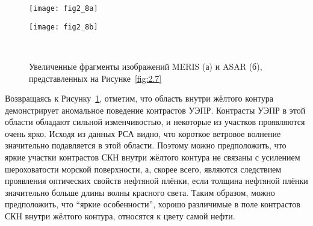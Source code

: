 \begin{figure}[!ht]
   	\centering
	\begin{minipage}{.49\textwidth}
	    \subcaptionbox{\label{fig:2.8a}}
		{\texttt{[image: fig2\_8a]}}
	\end{minipage}
	\hfill
	\begin{minipage}{.49\textwidth}
	    \subcaptionbox{\label{fig:2.8b}}
		{\texttt{[image: fig2\_8b]}}
	\end{minipage}
    \\
    \caption{Увеличенные фрагменты изображений MERIS (а) и ASAR (б), представленных на Рисунке~\ref{fig:2.7}}
    \label{fig:2.8}
\end{figure}


Возвращаясь к Рисунку~\ref{fig:2.8}, отметим, что область внутри жёлтого контура демонстрирует аномальное поведение контрастов УЭПР. Контрасты УЭПР в этой области обладают сильной изменчивостью, и некоторые из участков проявляются очень ярко. Исходя из данных РСА видно, что короткое ветровое волнение значительно подавляется в этой области. Поэтому можно предположить, что яркие участки контрастов СКН внутри жёлтого контура не связаны с усилением шероховатости морской поверхности, а, скорее всего, являются следствием проявления оптических свойств нефтяной плёнки, если толщина нефтяной плёнки значительно больше длины волны красного света. Таким образом, можно предположить, что ``яркие особенности'', хорошо различимые в поле контрастов СКН внутри жёлтого контура, относятся к цвету самой нефти.



